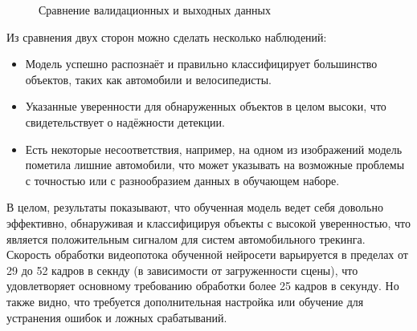 \begin{figure}[htb]
    \centering
    \qquad
    \caption{Сравнение валидационных и выходных данных}%
    \label{fig::ResultsCompare}%
\end{figure}

Из сравнения двух сторон можно сделать несколько наблюдений:

\begin{itemize}

	\item Модель успешно распознаёт и правильно классифицирует большинство объектов, 
	таких как автомобили и велосипедисты.
	\item Указанные уверенности для обнаруженных объектов в целом высоки, что 
	свидетельствует о надёжности детекции.
	\item Есть некоторые несоответствия, например, на одном из изображений модель 
	пометила лишние автомобили, что может указывать на возможные проблемы с точностью
	или с разнообразием данных в обучающем наборе.

\end{itemize}

В целом, результаты показывают, что обученная модель ведет себя довольно эффективно, 
обнаруживая и классифицируя объекты с высокой уверенностью, что является положительным
сигналом для систем автомобильного трекинга. Скорость обработки видеопотока обученной 
нейросети варьируется в пределах от 29 до 52 кадров в секнду (в зависимости от 
загруженности сцены), что удовлетворяет основному требованию обработки более 25 кадров
в секунду. Но также видно, что требуется дополнительная настройка или обучение для 
устранения ошибок и ложных срабатываний.